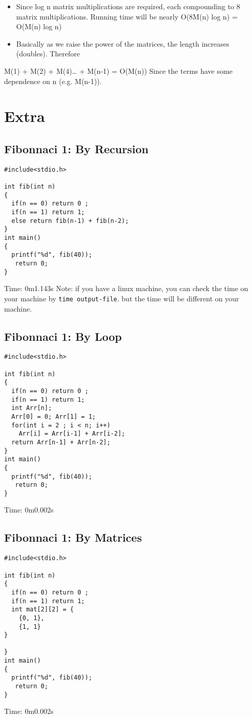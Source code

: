 \documentclass{book}
\begin{document}
\begin{itemize}
\item Since log n matrix multiplications are required, each compounding to 8 matrix multiplications. Running time will be nearly O(8M(n) log n) = O(M(n) log n)
\item Basically as we raise the power of the matrices, the length increases (doubles). Therefore
\end{itemize}
M(1) + M(2) + M(4)\ldots{} + M(n-1) = O(M(n))
Since the terms have some dependence on n (e.g. M(n-1)). 

\section{Extra}
\label{sec:orgd8a6d4a}


\subsection{Fibonnaci 1: By Recursion}
\label{sec:org481bd82}
\begin{verbatim}
#include<stdio.h>

int fib(int n)
{
  if(n == 0) return 0 ;
  if(n == 1) return 1;
  else return fib(n-1) + fib(n-2);  
}
int main()
{
  printf("%d", fib(40));
   return 0;
}
\end{verbatim}
Time: 0m1.143s
Note: if you have a linux machine, you can check the time on your machine by \texttt{time output-file}. but the time will be different on your machine.
\subsection{Fibonnaci 1: By Loop}
\label{sec:orgcd2b4df}
\begin{verbatim}
#include<stdio.h>

int fib(int n)
{
  if(n == 0) return 0 ;
  if(n == 1) return 1;
  int Arr[n];
  Arr[0] = 0; Arr[1] = 1;
  for(int i = 2 ; i < n; i++)
    Arr[i] = Arr[i-1] + Arr[i-2];
  return Arr[n-1] + Arr[n-2];
}
int main()
{
  printf("%d", fib(40));
   return 0;
}
\end{verbatim}
Time: 0m0.002s
\subsection{Fibonnaci 1: By Matrices}
\label{sec:org2ae5ec1}
\begin{verbatim}
#include<stdio.h>

int fib(int n)
{
  if(n == 0) return 0 ;
  if(n == 1) return 1;
  int mat[2][2] = {
    {0, 1},
    {1, 1}
}

}
int main()
{
  printf("%d", fib(40));
   return 0;
}
\end{verbatim}
Time: 0m0.002s
\mainmatter
\end{document}
